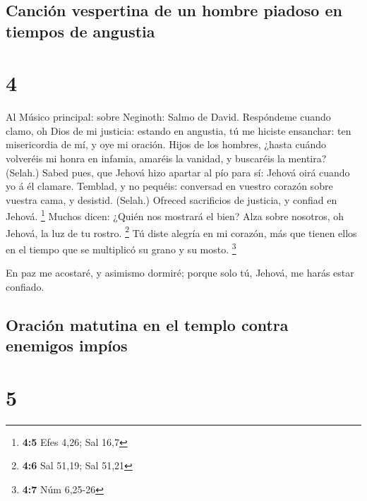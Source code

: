 \hypertarget{canciuxf3n-vespertina-de-un-hombre-piadoso-en-tiempos-de-angustia}{%
\subsection{Canción vespertina de un hombre piadoso en tiempos de
angustia}\label{canciuxf3n-vespertina-de-un-hombre-piadoso-en-tiempos-de-angustia}}

\hypertarget{section-3}{%
\section{4}\label{section-3}}

 Al Músico principal: sobre Neginoth: Salmo de David.
Respóndeme cuando clamo, oh Dios de mi justicia: estando en angustia, tú
me hiciste ensanchar: ten misericordia de mí, y oye mi oración.
 Hijos de los hombres, ¿hasta cuándo volveréis mi honra en
infamia, amaréis la vanidad, y buscaréis la mentira? (Selah.)
 Sabed pues, que Jehová hizo apartar al pío para sí: Jehová
oirá cuando yo á él clamare.  Temblad, y no pequéis:
conversad en vuestro corazón sobre vuestra cama, y desistid. (Selah.)
 Ofreced sacrificios de justicia, y confiad en Jehová.
\footnote{\textbf{4:5} Efes 4,26; Sal 16,7}  Muchos dicen:
¿Quién nos mostrará el bien? Alza sobre nosotros, oh Jehová, la luz de
tu rostro. \footnote{\textbf{4:6} Sal 51,19; Sal 51,21}  Tú
diste alegría en mi corazón, más que tienen ellos en el tiempo que se
multiplicó su grano y su mosto. \footnote{\textbf{4:7} Núm 6,25-26}

 En paz me acostaré, y asimismo dormiré; porque solo tú,
Jehová, me harás estar confiado.

\hypertarget{oraciuxf3n-matutina-en-el-templo-contra-enemigos-impuxedos}{%
\subsection{Oración matutina en el templo contra enemigos
impíos}\label{oraciuxf3n-matutina-en-el-templo-contra-enemigos-impuxedos}}

\hypertarget{section-4}{%
\section{5}\label{section-4}}

